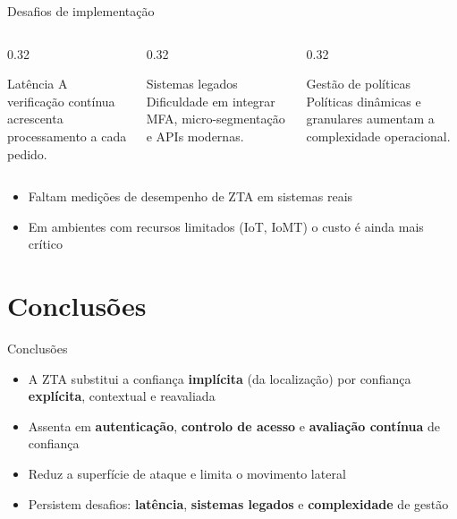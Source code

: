 \documentclass[aspectratio=169,11pt]{beamer}
\begin{document}
\begin{frame}{Desafios de implementação}
  \begin{columns}[T]
    \begin{column}{0.32\textwidth}
      \begin{block}{Latência}
        A verificação contínua acrescenta processamento a cada pedido.
      \end{block}
    \end{column}
    \begin{column}{0.32\textwidth}
      \begin{block}{Sistemas legados}
        Dificuldade em integrar MFA, micro-segmentação e APIs modernas.
      \end{block}
    \end{column}
    \begin{column}{0.32\textwidth}
      \begin{block}{Gestão de políticas}
        Políticas dinâmicas e granulares aumentam a complexidade operacional.
      \end{block}
    \end{column}
  \end{columns}
  \vspace{0.4cm}
  \begin{itemize}
    \item Faltam medições de desempenho de ZTA em sistemas reais
    \item Em ambientes com recursos limitados (IoT, IoMT) o custo é ainda mais crítico
  \end{itemize}
\end{frame}

\section{Conclusões}

\begin{frame}{Conclusões}
  \begin{itemize}
    \item A ZTA substitui a confiança \textbf{implícita} (da localização) por confiança \textbf{explícita}, contextual e reavaliada
    \item Assenta em \textbf{autenticação}, \textbf{controlo de acesso} e \textbf{avaliação contínua} de confiança
    \item Reduz a superfície de ataque e limita o movimento lateral
    \item Persistem desafios: \textbf{latência}, \textbf{sistemas legados} e \textbf{complexidade} de gestão
  \end{itemize}
  \vfill
\end{frame}
\end{document}

